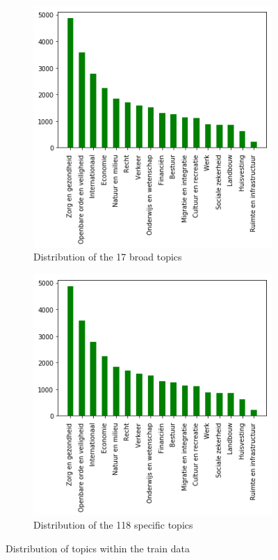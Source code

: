 \begin{figure}[H]
	\centering
	\begin{subfigure}{.5\textwidth}
  		\centering
  		\includegraphics[width=.9\linewidth]{TrainLabels17}
  		\caption{Distribution of the 17 broad topics}
  		\label{fig:TrainLabels17}
	\end{subfigure}%
	\begin{subfigure}{.5\textwidth}
  		\centering
  		\includegraphics[width=.9\linewidth]{TrainLabels17}
  		\caption{Distribution of the 118 specific topics}
  		\label{fig:TrainLabels118}
	\end{subfigure}
	\caption{Distribution of topics within the train data}
	\label{fig:distributiontopics}
\end{figure}

